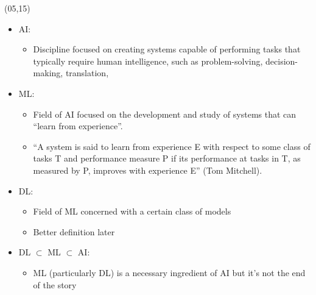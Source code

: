 \begin{frame}
  \begin{textblock}{90}(05,15)
    \begin{itemize}
    \item<2-> \acf{AI}:
      \begin{itemize}
      \item Discipline focused on creating systems capable of
        performing tasks that typically require human intelligence, such as
        problem-solving, decision-making, translation, \etc{}
      \end{itemize}
    \item<3-> \acf{ML}:
      \begin{itemize}
      \item Field of \ac{AI} focused on the development and study
        of systems that can ``learn from experience''.
      \item<4-> ``A system is said to learn from experience
        E with respect to some class of tasks T and performance measure P if
        its performance at tasks in T, as measured by P, improves with
        experience E'' (Tom Mitchell).
      \end{itemize}
    \item<5-> \acf{DL}:
      \begin{itemize}
      \item Field of \ac{ML} concerned with a certain class of
      models
      \item Better definition later
      \end{itemize}
    \item<6-> \ac{DL} $\subset$ \ac{ML} $\subset$ \ac{AI}:
      \begin{itemize}
      \item \ac{ML} (particularly \ac{DL}) is a necessary ingredient of \ac{AI}
        but it's not the end of the story
      \end{itemize}
    \end{itemize}
  \end{textblock}

\end{frame}


